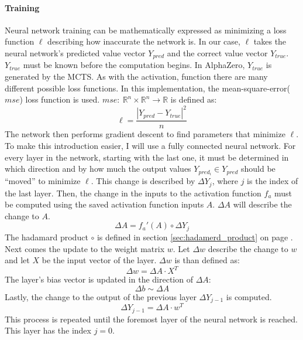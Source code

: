 \documentclass[12pt]{article}
\newcommand{\sectionref}[1]{section \ref{#1} on page \pageref{#1}}
\begin{document}
\paragraph{Training} 
Neural network training can be mathematically expressed as minimizing a loss function  \(\ell\) describing how inaccurate the network is. In our case, \(\ell\) takes the neural network's predicted value vector \(Y_{pred}\) and the correct value vector \(Y_{true}\). \(Y_{true}\) must be known before the computation begins. In AlphaZero, \(Y_{true}\) is generated by the MCTS. As with the activation, function there are many different possible loss functions. In this implementation, the mean-square-error(\(mse\)) loss function is used. \(mse:~\mathbb R^n\times\mathbb R^n \to \mathbb R\) is defined as:
\begin{equation} \label{eq:NN:loss_mse}
\ell = \frac{|Y_{pred} - Y_{true}|^2}{n}
\end{equation}
The network then performs gradient descent to find parameters that minimize \(\ell\). To make this introduction easier, I will use a fully connected neural network. For every layer in the network, starting with the last one, it must be determined in which direction and by how much the output values \(Y_{pred_i} \in Y_{pred}\) should be ``moved'' to minimize \(\ell\). This change is described by \(\Delta Y_j\), where \(j\) is the index of the last layer. Then, the change in the inputs to the activation function \(f_a\) must be computed using the saved activation function inputs \(A\). \(\Delta A\) will describe the change to \(A\).
\begin{equation}\label{eq:NN:deltaA}
\Delta A = f_a'(A) \circ \Delta Y_j
\end{equation}
The hadamard product \(\circ\) is 
defined in \sectionref{sec:hadamerd_product}.\\
Next comes the update to the weight matrix \(w\). Let \(\Delta w\) describe the change to \(w\) and let \(X\) be the input vector of the layer. \(\Delta w\) is than defined as:
\begin{equation}\label{eq:NN:deltaW}
\Delta w = \Delta A \cdot X^T
\end{equation}
The layer's bias vector is updated in the direction of \(\Delta A\):
\begin{equation}\label{eq:NN:deltaB}
\Delta b \sim \Delta A
\end{equation}
Lastly, the change to the output of the previous layer \(\Delta Y_{j-1}\) is computed.
\begin{equation} \label{eq:NN:deltaA_lastLayer}
\Delta Y_{j-1} = \Delta A \cdot w^T
\end{equation}
This process is repeated until the foremost layer of the neural network is reached. This layer has the index \(j=0\).
\end{document}
